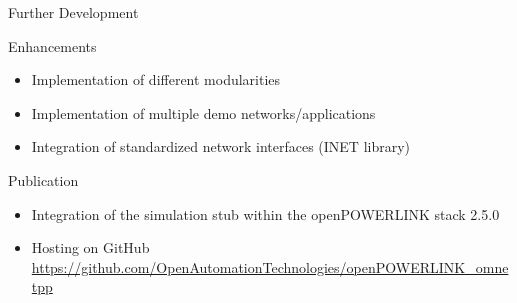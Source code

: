 \begin{frame}{Further Development}
    \begin{block}{Enhancements}
        \begin{itemize}
            \item Implementation of different modularities
            \item Implementation of multiple demo networks/applications
            \item Integration of standardized network interfaces (INET library)
        \end{itemize}
    \end{block}
    \begin{block}{Publication}
        \begin{itemize}
            \item Integration of the simulation stub within the openPOWERLINK stack 2.5.0
            \item Hosting on GitHub\\
            \url{https://github.com/OpenAutomationTechnologies/openPOWERLINK\_omnetpp}
        \end{itemize}
    \end{block}
\end{frame}